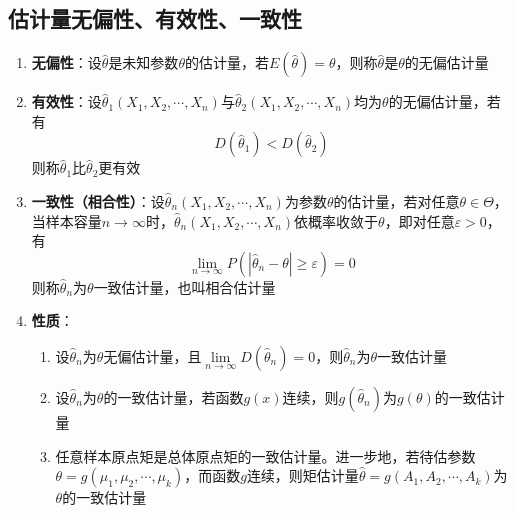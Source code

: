 \documentclass[12pt,a4paper,UTF8]{book}
\begin{document}
\subsection{估计量无偏性、有效性、一致性}
\begin{enumerate}
\item \textbf{无偏性}：设$\hat{\theta}$是未知参数$\theta$的估计量，若$E\left(\hat{\theta}\right)=\theta$，则称$\hat{\theta}$是$\theta$的无偏估计量
\item \textbf{有效性}：设$\hat{\theta}_1\left(X_1,X_2,\cdots,X_n\right)$与$\hat{\theta}_2\left(X_1,X_2,\cdots,X_n\right)$均为$\theta$的无偏估计量，若有
\[D\left(\hat{\theta}_1\right)<D\left(\hat{\theta}_2\right)\]
则称$\hat{\theta}_1$比$\hat{\theta}_2$更有效
\item \textbf{一致性（相合性）}：设$\hat{\theta}_n\left(X_1,X_2,\cdots,X_n\right)$为参数$\theta$的估计量，若对任意$\theta\in\varTheta$，当样本容量$n\to\infty$时，$\hat{\theta}_n\left(X_1,X_2,\cdots,X_n\right)$依概率收敛于$\theta$，即对任意$\varepsilon>0$，有
\[\lim\limits_{n\to\infty}P\left(\left|\hat{\theta}_n-\theta\right|\geq\varepsilon\right)=0\]
则称$\hat{\theta}_n$为$\theta$一致估计量，也叫相合估计量
\item \textbf{性质}：
\begin{enumerate}
\item 设$\hat{\theta}_n$为$\theta$无偏估计量，且$\lim\limits_{n\to\infty}D\left(\hat{\theta}_n\right)=0$，则$\hat{\theta}_n$为$\theta$一致估计量
\item 设$\hat{\theta}_n$为$\theta$的一致估计量，若函数$g\left(x\right)$连续，则$g\left(\hat{\theta}_n\right)$为$g\left(\theta\right)$的一致估计量
\item 任意样本原点矩是总体原点矩的一致估计量。进一步地，若待估参数$\theta=g\left(\mu_1,\mu_2,\cdots,\mu_k\right)$，而函数$g$连续，则矩估计量$\hat{\theta}=g\left(A_1,A_2,\cdots,A_k\right)$为$\theta$的一致估计量
\end{enumerate}
\end{enumerate}
\end{document}
